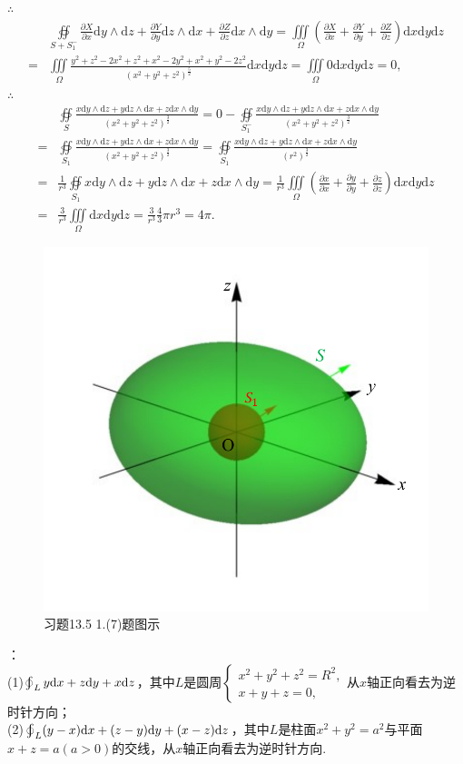 \documentclass[12pt,UTF8]{ctexart}
\newcommand{\varIIInt}[5]{\iiint\limits_{#1}#2\mathrm d#3\mathrm d#4\mathrm d#5}
\newcommand{\BLOInt}[2]{\varoint\nolimits_{#1}#2}
\newcommand{\md}[1]{\mathrm d#1}
\newcommand{\pp}[2]{\frac{\partial #1}{\partial #2}}
\newcommand{\BSOIInt}[2]{\oiint\limits_{#1}#2}
\begin{document}
\begin{enumerate}
$\therefore$
\[\begin{aligned}
&\BSOIInt{S+S_1^-}{\pp Xx\md y\wedge\md z+\pp Yy\md z\wedge\md x+\pp Zz\md x\wedge\md y}=\varIIInt\Omega{(\pp Xx+\pp Yy+\pp Zz)}xyz\\
=&\varIIInt\Omega{\frac{y^2+z^2-2x^2+z^2+x^2-2y^2+x^2+y^2-2z^2}{(x^2+y^2+z^2)^{\frac52}}}xyz=\varIIInt\Omega{0}xyz=0,
\end{aligned}\]
$\therefore$
\[\begin{aligned}
&\BSOIInt S{\frac{x\md y\wedge\md z+y\md z\wedge\md x+z\md x\wedge\md y}{(x^2+y^2+z^2)^{\frac32}}}=0-\BSOIInt{S_1^-}{\frac{x\md y\wedge\md z+y\md z\wedge\md x+z\md x\wedge\md y}{(x^2+y^2+z^2)^{\frac32}}}\\
=&\BSOIInt{S_1}{\frac{x\md y\wedge\md z+y\md z\wedge\md x+z\md x\wedge\md y}{(x^2+y^2+z^2)^{\frac32}}}=\BSOIInt{S_1}{\frac{x\md y\wedge\md z+y\md z\wedge\md x+z\md x\wedge\md y}{(r^2)^{\frac32}}}\\=&\frac1{r^3}\BSOIInt{S_1}{x\md y\wedge\md z+y\md z\wedge\md x+z\md x\wedge\md y}=\frac1{r^3}\varIIInt\Omega{(\pp xx+\pp yy+\pp zz)}xyz\\
=&\frac3{r^3}\varIIInt\Omega{}xyz=\frac3{r^3}\frac43\pi r^3=4\pi.
\end{aligned}\]
\begin{figure}[H]
\begin{center}
\includegraphics[height=0.5\textheight]{Figures24/Fig13-5-1-7.pdf}
\end{center}
\caption{习题13.5 1.(7)题图示}
\label{13-5-1-7}
\end{figure}
：\\
(1)$\BLOInt L{y\md x+z\md y+x\md z}$，其中$L$是圆周$\begin{cases}
x^2+y^2+z^2=R^2,\\
x+y+z=0,
\end{cases}$从$x$轴正向看去为逆时针方向；\\
(2)$\BLOInt L{(y-x)\md x+(z-y)\md y+(x-z)\md z}$，其中$L$是柱面$x^2+y^2=a^2$与平面$x+z=a(a>0)$的交线，从$x$轴正向看去为逆时针方向.


\end{enumerate}
\end{document}
